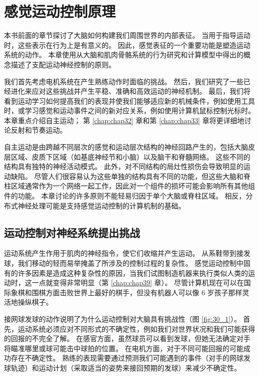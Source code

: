\chapter{感觉运动控制原理} \label{chap:chap30}

本书前面的章节探讨了大脑如何构建我们周围世界的内部表征。
当用于指导运动时，这些表示在行为上是有意义的。
因此，感觉表征的一个重要功能是塑造运动系统的动作。 
本章使用从大脑和肌肉骨骼系统的行为研究和计算模型中得出的概念描述了支配运动神经控制的原则。


我们首先考虑电机系统在产生熟练动作时面临的挑战。 
然后，我们研究了一些已经进化来应对这些挑战并产生平稳、准确和高效运动的神经机制。
最后，我们将看到运动学习如何提高我们的表现并使我们能够适应新的机械条件，例如使用工具时，或学习感觉和运动事件之间的新对应关系，例如使用计算机鼠标控制光标时。
本章重点介绍自主运动； 第 \ref{chap:chap32} 章和第 \ref{chap:chap33} 章将更详细地讨论反射和节奏运动。


自主运动是由跨越不同层次的感觉和运动层次结构的神经回路产生的，包括大脑皮层区域、皮质下区域（如基底神经节和小脑）以及脑干和脊髓网络。
这些不同的结构具有独特的神经活动模式。
此外，对不同结构的局灶性损伤会导致明显的运动缺陷。 
尽管人们很容易认为这些单独的结构具有不同的功能，但这些大脑和脊柱区域通常作为一个网络一起工作，因此对一个组件的损坏可能会影响所有其他组件的功能。
本章讨论的许多原则不能轻易归因于单个大脑或脊柱区域。
相反，分布式神经处理可能是支持感觉运动控制的计算机制的基础。


\section{运动控制对神经系统提出挑战}

运动系统产生作用于肌肉的神经指令，使它们收缩并产生运动。
从系鞋带到接发球，我们移动的轻而易举掩盖了所涉及的控制过程的复杂性。
感觉运动控制中固有的许多因素是造成这种复杂性的原因，当我们试图制造机器来执行类似人类的运动时，这一点就变得非常明显（第 \ref{chap:chap39} 章）。 
尽管计算机现在可以在国际象棋和围棋方面击败世界上最好的棋手，但没有机器人可以像 6 岁孩子那样灵活地操纵棋子。


接网球发球的动作说明了为什么运动控制对大脑具有挑战性（图 \ref{fig:30_1}）。
首先，运动系统必须应对不同形式的不确定性，例如我们对世界状况和我们可能获得的回报的不完全了解。
在感官方面，虽然球员可以看到发球，但她无法确定对手将瞄准哪里或球可能击中球拍的位置。
在电机方面，对于不同可能回报的可能成功存在不确定性。
熟练的表现需要通过预测我们可能遇到的事件（对手的网球发球轨迹）和运动计划（采取适当的姿势来接回预期的发球）来减少不确定性。



